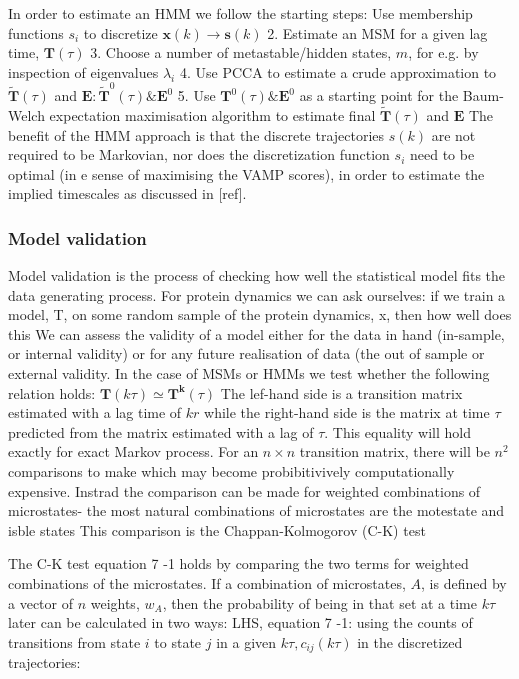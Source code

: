 In order to estimate an HMM we follow the starting steps:
Use membership functions $s_{i}$ to discretize $\mathbf{x}(k) \rightarrow \mathbf{s}(k)$
2. Estimate an MSM for a given lag time, $\mathbf{T}(\tau)$
3. Choose a number of metastable/hidden states, $m$, for e.g. by inspection of eigenvalues $\lambda_{i}$
4. Use PCCA to estimate a crude approximation to $\tilde{\mathbf{T}}(\tau)$ and $\mathbf{E}: \tilde{\mathbf{T}}^{0}(\tau) \& \mathbf{E}^{0}$
5. Use $\mathbf{T}^{0}(\tau) \& \mathbf{E}^{0}$ as a starting point for the Baum-Welch expectation maximisation algorithm to estimate final $\widetilde{\mathbf{T}}(\tau)$ and $\mathbf{E}$
The benefit of the HMM approach is that the discrete trajectories $s(k)$ are not required to be Markovian, nor does the discretization function $s_{i}$ need to be optimal (in
e sense of maximising the VAMP scores), in order to estimate the implied timescales as discussed in [ref].



\subsubsection{Model validation}\label{sec:model_validation}

Model validation is the process of checking how well the statistical model fits the data generating process. For protein dynamics we can ask ourselves: if we train a model, T, on some random sample of the protein dynamics, x, then how well does this We can assess the validity of a model either for the data in hand (in-sample, or internal validity) or for any future realisation of data (the out of sample or external validity. In the case of MSMs or HMMs we test whether the following relation holds:
$\mathbf{T}(k \tau) \simeq \mathbf{T}^{\mathbf{k}}(\tau)$
The lef-hand side is a transition matrix estimated with a lag time of $k r$ while the right-hand side is the matrix at time $\tau$ predicted from the matrix estimated with a lag of $\tau$. This equality will hold exactly for exact Markov process. For an $n \times n$ transition matrix, there will be $n^{2}$ comparisons to make which may become probibitivively computationally expensive. Instrad the comparison can be made for weighted combinations of microstates- the most natural combinations of microstates are the motestate and isble states This comparison is the Chappan-Kolmogorov (C-K) test

The C-K test equation 7 -1 holds by comparing the two terms for weighted combinations of the microstates. If a combination of microstates, $A$, is defined by a vector of $n$ weights, $w_{A}$, then the probability of being in that set at a time $k \tau$ later can be calculated in two ways:
LHS, equation 7 -1: using the counts of transitions from state $i$ to state $j$ in a given $k \tau, c_{i j}(k \tau)$ in the discretized trajectories:

